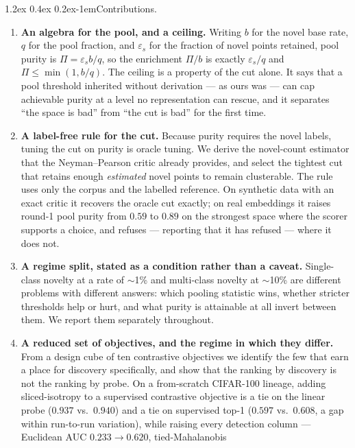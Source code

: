\documentclass{article}
\makeatletter
\renewcommand\paragraph{\@startsection{paragraph}{4}{\z@}%
  {1.2ex \@plus 0.4ex \@minus 0.2ex}{-1em}{\normalsize\bf}}
\makeatother
\begin{document}
\paragraph{Contributions.}
\begin{enumerate}
\item \textbf{An algebra for the pool, and a ceiling.} Writing $b$ for the
  novel base rate, $q$ for the pool fraction, and $\varepsilon_s$ for the
  fraction of novel points retained, pool purity is
  $\Pi = \varepsilon_s b / q$, so the enrichment $\Pi/b$ is exactly
  $\varepsilon_s/q$ and
  $\Pi \le \min(1, b/q)$. The ceiling is a property of the cut alone. It says
  that a pool threshold inherited without derivation --- as ours was --- can
  cap achievable purity at a level no representation can rescue, and it
  separates ``the space is bad'' from ``the cut is bad'' for the first
  time.
\item \textbf{A label-free rule for the cut.} Because purity requires the
  novel labels, tuning the cut on purity is oracle tuning. We derive the
  novel-count estimator that the Neyman--Pearson critic already provides, and
  select the tightest cut that retains enough \emph{estimated} novel points to
  remain clusterable. The rule uses only the corpus and the labelled
  reference. On synthetic data with an exact critic it recovers the oracle cut
  exactly; on real embeddings it raises round-1 pool purity from $0.59$ to
  $0.89$ on the strongest space where the scorer supports a choice, and
  refuses --- reporting that it has refused --- where it does not.
\item \textbf{A regime split, stated as a condition rather than a caveat.}
  Single-class novelty at a rate of $\sim$1\% and multi-class novelty at
  $\sim$10\% are different problems with different answers: which pooling
  statistic wins, whether stricter thresholds help or hurt, and what purity
  is attainable at all invert between them. We report them separately
  throughout.
\item \textbf{A reduced set of objectives, and the regime in which they
  differ.} From a design cube of ten contrastive objectives we identify the
  few that earn a place for discovery specifically, and show that the ranking
  by discovery is not the ranking by probe. On a from-scratch CIFAR-100
  lineage, adding sliced-isotropy to a supervised contrastive objective is a
  tie on the linear probe ($0.937$ vs.\ $0.940$) and a tie on supervised top-1
  ($0.597$ vs.\ $0.608$, a gap within run-to-run variation), while raising every
  detection column --- Euclidean AUC $0.233 \to 0.620$, tied-Mahalanobis

\end{enumerate}
\end{document}
